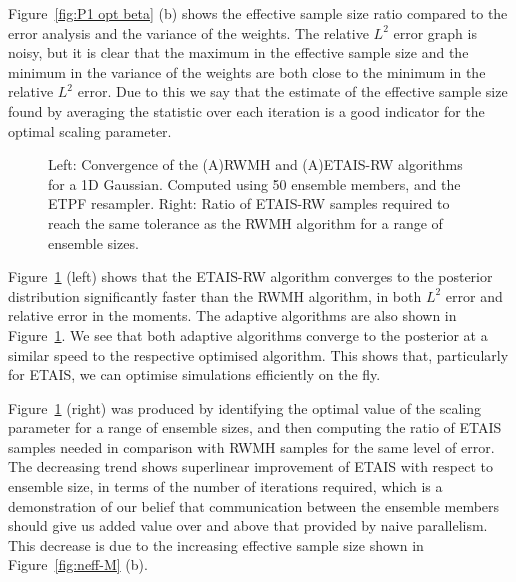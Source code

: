 \documentclass[final]{siamltex}
\begin{document}
Figure~\ref{fig:P1 opt beta} (b) shows the effective sample size ratio
compared to the error analysis and the variance of the weights. The
relative $L^2$ error graph is noisy, but it is clear that the maximum
in the effective sample size and the minimum in the variance of the
weights are both close to the minimum in the relative $L^2$ error. Due
to this we say that the estimate of the effective sample size found by
averaging the statistic over each iteration is a good indicator for
the optimal scaling parameter.

\begin{figure}[htb]
\centering 
{}

\caption{Left: Convergence of the (A)RWMH and (A)ETAIS-RW algorithms
  for a 1D Gaussian. Computed using 50 ensemble members, and the
  ETPF resampler. Right: Ratio of ETAIS-RW samples required to reach the same tolerance
  as the RWMH algorithm for a range of ensemble sizes. }
\label{fig:MH1 L2}
\end{figure}


Figure~\ref{fig:MH1 L2} (left) shows that the ETAIS-RW algorithm converges
to the posterior distribution significantly faster than the RWMH
algorithm, in both $L^2$ error and relative error in the moments. The adaptive algorithms are also shown
in Figure~\ref{fig:MH1 L2}. We see that both adaptive algorithms
converge to the posterior at a similar speed to the respective
optimised algorithm. This shows that, particularly for ETAIS, we can
optimise simulations efficiently on the fly.


Figure~\ref{fig:MH1 L2} (right) was produced by identifying the
optimal value of the scaling parameter for a range of ensemble sizes,
and then computing the ratio of ETAIS samples needed in comparison
with RWMH samples for the same level of error. The decreasing trend shows superlinear improvement of
ETAIS with respect to ensemble size, in terms of the number of
iterations required, which is a demonstration of our belief that
communication between the ensemble members should give us added value over and above that
provided by naive parallelism. This decrease is due to the increasing
effective sample size shown in Figure~\ref{fig:neff-M} (b).
\end{document}
